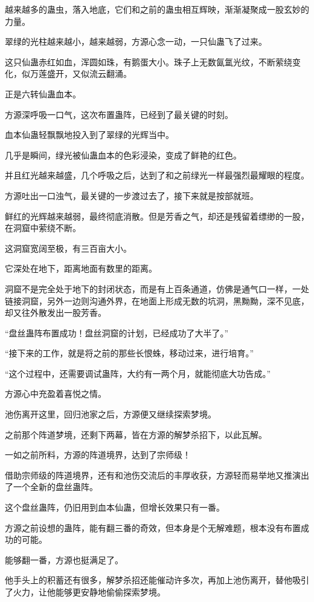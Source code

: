 \begin{this_body}
越来越多的蛊虫，落入地底，它们和之前的蛊虫相互辉映，渐渐凝聚成一股玄妙的力量。

翠绿的光柱越来越小，越来越弱，方源心念一动，一只仙蛊飞了过来。

这只仙蛊赤红如血，浑圆如珠，有鹅蛋大小。珠子上无数氤氲光纹，不断萦绕变化，似万莲盛开，又似流云翻涌。

正是六转仙蛊血本。

方源深呼吸一口气，这次布置蛊阵，已经到了最关键的时刻。

血本仙蛊轻飘飘地投入到了翠绿的光辉当中。

几乎是瞬间，绿光被仙蛊血本的色彩浸染，变成了鲜艳的红色。

并且红光越来越盛，几个呼吸之后，达到了和之前绿光一样最强烈最耀眼的程度。

方源吐出一口浊气，最关键的一步渡过去了，接下来就是按部就班。

鲜红的光辉越来越弱，最终彻底消散。但是芳香之气，却还是残留着缥缈的一股，在洞窟中萦绕不断。

这洞窟宽阔至极，有三百亩大小。

它深处在地下，距离地面有数里的距离。

洞窟不是完全处于地下的封闭状态，而是有上百条通道，仿佛是通气口一样，一处链接洞窟，另外一边则沟通外界，在地面上形成无数的坑洞，黑黝黝，深不见底，却又往外散发出一股芳香。

“盘丝蛊阵布置成功！盘丝洞窟的计划，已经成功了大半了。”

“接下来的工作，就是将之前的那些长恨蛛，移动过来，进行培育。”

“这个过程中，还需要调试蛊阵，大约有一两个月，就能彻底大功告成。”

方源心中充盈着喜悦之情。

池伤离开这里，回归池家之后，方源便又继续探索梦境。

之前那个阵道梦境，还剩下两幕，皆在方源的解梦杀招下，以此瓦解。

一如之前所料，方源的阵道境界，达到了宗师级！

借助宗师级的阵道境界，还有和池伤交流后的丰厚收获，方源轻而易举地又推演出了一个全新的盘丝蛊阵。

这个盘丝蛊阵，仍旧用到血本仙蛊，但增长效果只有一番。

方源之前设想的蛊阵，能有翻三番的奇效，但本身是个无解难题，根本没有布置成功的可能。

能够翻一番，方源也挺满足了。

他手头上的积蓄还有很多，解梦杀招还能催动许多次，再加上池伤离开，替他吸引了火力，让他能够更安静地偷偷探索梦境。


\end{this_body}
